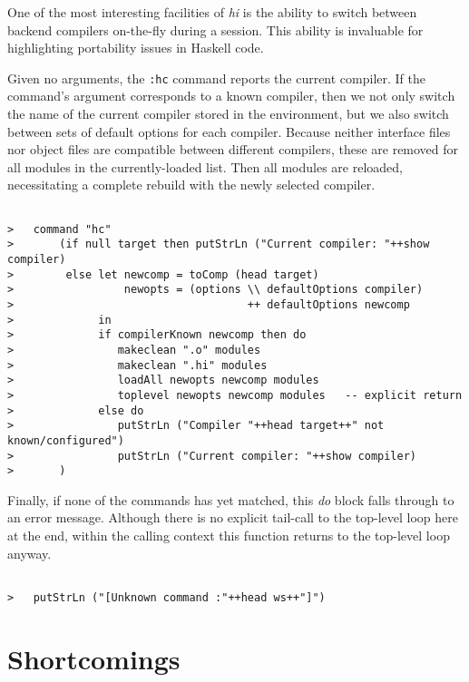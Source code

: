 \documentclass[a4paper]{article}
\begin{document}
One of the most interesting facilities of {\em hi} is the ability
to switch between backend compilers on-the-fly during a session.
This ability is invaluable for highlighting portability issues in
Haskell code.

Given no arguments, the {\tt :hc} command reports the current compiler.
If the command's argument corresponds to a known compiler, then we not
only switch the name of the current compiler stored in the environment,
but we also switch between sets of default options for each compiler.
Because neither interface files nor object files are compatible
between different compilers, these are removed for all modules in the
currently-loaded list.  Then all modules are reloaded, necessitating
a complete rebuild with the newly selected compiler.

\begin{verbatim}

>   command "hc"
>       (if null target then putStrLn ("Current compiler: "++show compiler)
>        else let newcomp = toComp (head target)
>                 newopts = (options \\ defaultOptions compiler)
>                                    ++ defaultOptions newcomp
>             in
>             if compilerKnown newcomp then do
>                makeclean ".o" modules
>                makeclean ".hi" modules
>                loadAll newopts newcomp modules
>                toplevel newopts newcomp modules	-- explicit return
>             else do
>                putStrLn ("Compiler "++head target++" not known/configured")
>                putStrLn ("Current compiler: "++show compiler)
>       )

\end{verbatim}

Finally, if none of the commands has yet matched, this {\em do} block
falls through to an error message.  Although there is no explicit
tail-call to the top-level loop here at the end, within the calling
context this function returns to the top-level loop anyway.

\begin{verbatim}

>   putStrLn ("[Unknown command :"++head ws++"]")

\end{verbatim}


\section{Shortcomings}
\end{document}
